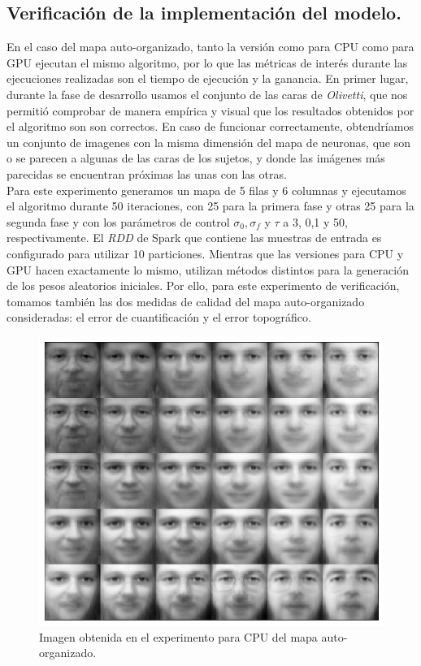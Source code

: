 \subsection{Verificación de la implementación del modelo.}
En el caso del mapa auto-organizado, tanto la versión como para CPU como para GPU ejecutan el mismo algoritmo, por lo que las métricas de interés durante las ejecuciones realizadas son el tiempo de ejecución y la ganancia. En primer lugar, durante la fase de desarrollo usamos el conjunto de las caras de \textit{Olivetti}, que nos permitió comprobar de manera empírica y visual que los resultados obtenidos por el algoritmo son son correctos. En caso de funcionar correctamente, obtendríamos un conjunto de imagenes con la misma dimensión del mapa de neuronas, que son o se parecen a algunas de las caras de los sujetos, y donde las imágenes más parecidas se encuentran próximas las unas con las otras. \\

Para este experimento generamos un mapa de 5 filas y 6 columnas y ejecutamos el algoritmo durante 50 iteraciones, con 25 para la primera fase y otras 25 para la segunda fase y con los parámetros de control $\sigma_0, \sigma_f$ y $\tau$ a 3, 0,1 y 50, respectivamente. El \textit{RDD} de Spark que contiene las muestras de entrada es configurado para utilizar 10 particiones. Mientras que las versiones para CPU y GPU hacen exactamente lo mismo, utilizan métodos distintos para la generación de los pesos aleatorios iniciales. Por ello, para este experimento de verificación, tomamos también las dos medidas de calidad del mapa auto-organizado consideradas: el error de cuantificación y el error topográfico.\\

\begin{figure}[ht]
\centering
\includegraphics[scale=0.3]{imagenes/facescpu.png}
\caption{Imagen obtenida en el experimento para CPU del mapa auto-organizado.}
\label{img:somcpu}
\end{figure}


